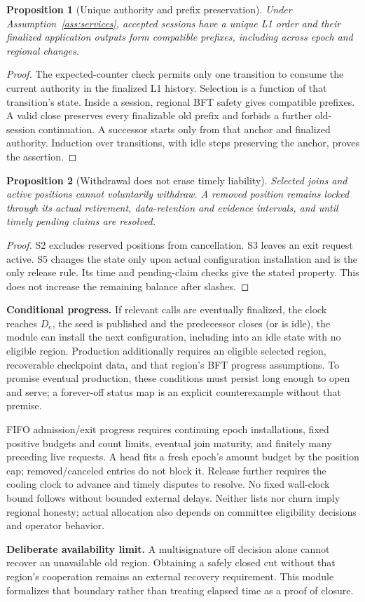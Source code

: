 \documentclass[11pt,a4paper]{article}
\newtheorem{proposition}{Proposition}
\begin{document}
\begin{proposition}[Unique authority and prefix preservation]
Under Assumption~\ref{ass:services}, accepted sessions have a unique L1
order and their finalized application outputs form compatible prefixes,
including across epoch and regional changes.
\end{proposition}
\begin{proof}
The expected-counter check permits only one transition to consume the
current authority in the finalized L1 history. Selection is a function
of that transition's state. Inside a session, regional BFT safety gives
compatible prefixes. A valid close preserves every finalizable old prefix
and forbids a further old-session continuation. A successor starts only
from that anchor and finalized authority. Induction over transitions,
with idle steps preserving the anchor, proves the assertion.
\end{proof}

\begin{proposition}[Withdrawal does not erase timely liability]
Selected joins and active positions cannot voluntarily withdraw. A removed
position remains locked through its actual retirement, data-retention and
evidence intervals, and until timely pending claims are resolved.
\end{proposition}
\begin{proof}
S2 excludes reserved positions from cancellation. S3 leaves an exit request
active. S5 changes the state only upon actual configuration installation
and is the only release rule. Its time and pending-claim checks give the
stated property. This does not increase the remaining balance after slashes.
\end{proof}

\textbf{Conditional progress.} If relevant calls are eventually finalized,
the clock reaches $D_e$, the seed is published and the predecessor closes
(or is idle), the module can install the next configuration, including into
an idle state with no eligible region. Production additionally requires an
eligible selected region, recoverable checkpoint data, and that region's
BFT progress assumptions. To promise eventual production, these conditions
must persist long enough to open and serve; a forever-off status map is
an explicit counterexample without that premise.

FIFO admission/exit progress requires continuing epoch installations,
fixed positive budgets and count limits, eventual join maturity, and
finitely many preceding live requests. A head fits a fresh epoch's amount
budget by the position cap; removed/canceled entries do not block it.
Release further requires the cooling clock to advance and timely disputes
to resolve. No fixed wall-clock bound follows without bounded external
delays. Neither lists nor churn imply regional honesty; actual allocation
also depends on committee eligibility decisions and operator behavior.

\textbf{Deliberate availability limit.} A multisignature off decision alone
cannot recover an unavailable old region. Obtaining a safely closed cut
without that region's cooperation remains an external recovery requirement.
This module formalizes that boundary rather than treating elapsed time
as a proof of closure.
\end{document}
